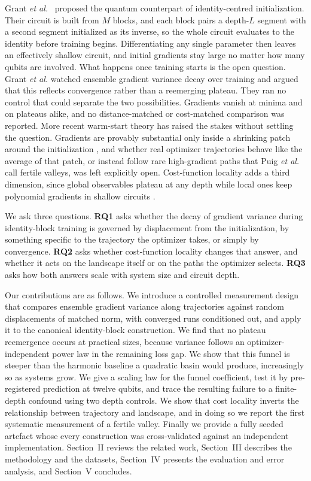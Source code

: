 \documentclass[conference]{IEEEtran}%
\begin{document}
Grant \emph{et al.}~\cite{grant} proposed the quantum counterpart of identity-centred initialization. Their circuit is built from $M$ blocks, and each block pairs a depth-$L$ segment with a second segment initialized as its inverse, so the whole circuit evaluates to the identity before training begins. Differentiating any single parameter then leaves an effectively shallow circuit, and initial gradients stay large no matter how many qubits are involved. What happens once training starts is the open question. Grant \emph{et al.} watched ensemble gradient variance decay over training and argued that this reflects convergence rather than a reemerging plateau. They ran no control that could separate the two possibilities. Gradients vanish at minima and on plateaus alike, and no distance-matched or cost-matched comparison was reported. More recent warm-start theory has raised the stakes without settling the question. Gradients are provably substantial only inside a shrinking patch around the initialization \cite{puig,mhiri}, and whether real optimizer trajectories behave like the average of that patch, or instead follow rare high-gradient paths that Puig \emph{et al.} call fertile valleys, was left explicitly open. Cost-function locality adds a third dimension, since global observables plateau at any depth while local ones keep polynomial gradients in shallow circuits \cite{cerezo}.

We ask three questions. \textbf{RQ1} asks whether the decay of gradient variance during identity-block training is governed by displacement from the initialization, by something specific to the trajectory the optimizer takes, or simply by convergence. \textbf{RQ2} asks whether cost-function locality changes that answer, and whether it acts on the landscape itself or on the paths the optimizer selects. \textbf{RQ3} asks how both answers scale with system size and circuit depth.

Our contributions are as follows. We introduce a controlled measurement design that compares ensemble gradient variance along trajectories against random displacements of matched norm, with converged runs conditioned out, and apply it to the canonical identity-block construction. We find that no plateau reemergence occurs at practical sizes, because variance follows an optimizer-independent power law in the remaining loss gap. We show that this funnel is steeper than the harmonic baseline a quadratic basin would produce, increasingly so as systems grow. We give a scaling law for the funnel coefficient, test it by pre-registered prediction at twelve qubits, and trace the resulting failure to a finite-depth confound using two depth controls. We show that cost locality inverts the relationship between trajectory and landscape, and in doing so we report the first systematic measurement of a fertile valley. Finally we provide a fully seeded artefact whose every construction was cross-validated against an independent implementation. Section~II reviews the related work, Section~III describes the methodology and the datasets, Section~IV presents the evaluation and error analysis, and Section~V concludes.
\end{document}
